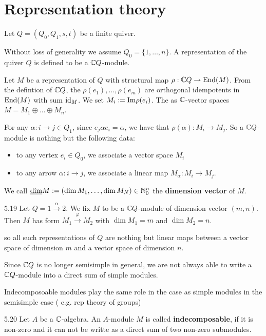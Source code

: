 \documentclass[twoside = false,	%
		headsepline,		%
		parskip = true,
		]{scrbook}						%
\begin{document}
\section{Representation theory}
    Let $Q = (Q_0,Q_1,s,t)$ be a finite quiver.

    Without loss of generality we assume $Q_0 = \{1,\dots,n\}$. A representation of the quiver $Q$ is defined to be a $\mathbb C Q$-module.

    Let $M$ be a representation of $Q$ with structural map $\rho: \mathbb C Q \to \mathrm{End}(M)$. From the defintion of $\mathbb C Q$, the $\rho(e_1),\dots,\rho(e_m)$ are orthogonal idempotents in $\mathrm{End}(M)$ with sum $\mathrm{id}_M$. We set $M_i := \mathrm{Im} \rho (e_i)$. The as $\mathbb C$-vector spaces $M = M_1 \oplus \dots \oplus M_n$.

    For any $\alpha: i \to j \in Q_1$, since $e_j \alpha e_i = \alpha$, we have that $\rho(\alpha): M_i \to M_j$. So a $\mathbb C Q$-module is nothing but the following data:

    \begin{itemize}
        \item to any vertex $e_i \in Q_0$, we associate a vector space $M_i$
        \item to any arrow $\alpha: i \to j$, we associate a linear map $M_\alpha: M_i \to M_j$.
    \end{itemize}

    We call $\underline{\dim} M:= \left( \dim M_1,\dots,\dim M_N\right) \in \mathbb N_0^n$ the \textbf{dimension vector} of $M$.

    \begin{example}{}{5.19}
        Let $Q = 1 \xrightarrow{\alpha} 2$. We fix $M$ to be a $\mathbb C Q$-module of dimension vector $(m,n)$. Then $M$ has form $M_1 \xrightarrow{\varphi} M_2$ with $\dim M_1 = m$ and $\dim M_2 = n$.

        so all such representations of $Q$ are nothing but linear maps between a vector space of dimension $m$ and a vector space of dimension $n$.
    \end{example}

    Since $\mathbb C Q$ is no longer semisimple in general, we are not always able to write a $\mathbb C Q$-module into a direct sum of simple modules.

    Indecomposoable modules play the same role in the case as simple modules in the semisimple case ( e.g. rep theory of groups)

    \begin{definition}{}{5.20}
        Let $A$ be a $\mathbb C$-algebra. An $A$-module $M$ is called \textbf{indecomposable}, if it is non-zero and it can not be writte as a direct sum of two non-zero submodules. 
    \end{definition}
\end{document}
